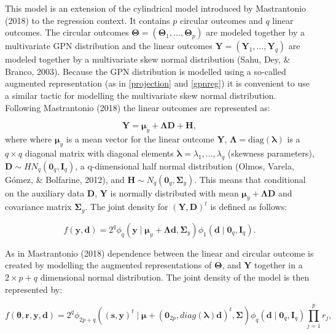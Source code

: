 \documentclass[11pt,]{article}
\begin{document}
This model is an extension of the cylindrical model introduced by
Mastrantonio (2018) to the regression context. It contains \(p\)
circular outcomes and \(q\) linear outcomes. The circular outcomes
\(\boldsymbol{\Theta} = (\boldsymbol{\Theta}_1, \dots, \boldsymbol{\Theta}_p)\)
are modeled together by a multivariate GPN distribution and the linear
outcomes
\(\boldsymbol{Y} = (\boldsymbol{Y}_1, \dots, \boldsymbol{Y}_q)\) are
modeled together by a multivariate skew normal distribution (Sahu, Dey,
\& Branco, 2003). Because the GPN distribution is modelled using a
so-called augmented representation (as in \eqref{projection} and
\eqref{gpnreg}) it is convenient to use a similar tactic for modelling
the multivariate skew normal distribution. Following Mastrantonio (2018)
the linear outcomes are represented as:

\[\boldsymbol{Y} = \boldsymbol{\mu}_y + \boldsymbol{\Lambda}\boldsymbol{D} + \boldsymbol{H},\]
where where \(\boldsymbol{\mu}_y\) is a mean vector for the linear
outcome \(\boldsymbol{Y}\),
\(\boldsymbol{\Lambda} = \text{diag}(\boldsymbol{\lambda})\) is a
\(q \times q\) diagonal matrix with diagonal elements
\(\boldsymbol{\lambda} = \lambda_1, \dots, \lambda_q\) (skewness
parameters),
\(\boldsymbol{D} \sim HN_q(\boldsymbol{0}_q, \boldsymbol{I}_q)\), a
q-dimensional half normal distribution (Olmos, Varela, Gómez, \&
Bolfarine, 2012), and
\(\boldsymbol{H} \sim N_q(\boldsymbol{0}_q, \boldsymbol{\Sigma}_y)\).
This means that conditional on the auxiliary data \(\boldsymbol{D}\),
\(\boldsymbol{Y}\) is normally distributed with mean
\(\boldsymbol{\mu}_y + \boldsymbol{\Lambda}\boldsymbol{D}\) and
covariance matrix \(\boldsymbol{\Sigma}_y\). The joint density for
\((\boldsymbol{Y}, \boldsymbol{D})^t\) is defined as follows:

\begin{equation}\label{YDjoint}
f(\boldsymbol{y}, \boldsymbol{d}) = 2^q\phi_q(\boldsymbol{y} \mid \boldsymbol{\mu}_y + \boldsymbol{\Lambda}\boldsymbol{d}, \boldsymbol{\Sigma}_y) \phi_1(\boldsymbol{d} \mid \boldsymbol{0}_q, \boldsymbol{I}_q).
\end{equation}

As in Mastrantonio (2018) dependence between the linear and circular
outcome is created by modelling the augmented representations of
\(\boldsymbol{\Theta}\), and \(\boldsymbol{Y}\) together in a
\(2 \times p + q\) dimensional normal distribution. The joint density of
the model is then represented by:

\begin{equation}\label{YDThetarjoint}
f(\boldsymbol{\theta}, \boldsymbol{r}, \boldsymbol{y}, \boldsymbol{d}) = 2^q\phi_{2p+q}((\boldsymbol{s}, \boldsymbol{y})^t \mid \boldsymbol{\mu} + (\boldsymbol{0}_{2p}, diag(\boldsymbol{\lambda})\boldsymbol{d})^t, \boldsymbol{\Sigma}) \phi_q(\boldsymbol{d} \mid \boldsymbol{0}_q, \boldsymbol{I}_q) \prod_{j = 1}^{p}r_j,
\end{equation}
\end{document}
